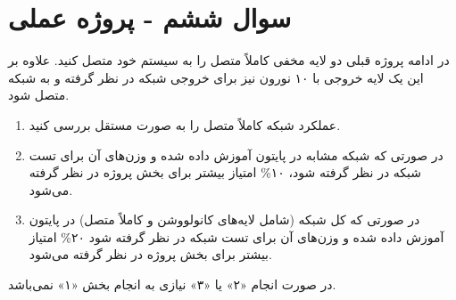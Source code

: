 \section{سوال ششم - پروژه عملی}


در ادامه پروژه قبلی دو لایه مخفی کاملاً متصل را به سیستم خود متصل کنید. علاوه بر این یک لایه خروجی با ۱۰ نورون نیز برای خروجی شبکه در نظر گرفته و به شبکه متصل شود.



\begin{enumerate}
	\item عملکرد شبکه کاملاً متصل را به صورت مستقل بررسی کنید.
	\item در صورتی که شبکه مشابه در پایتون آموزش داده شده و وزن‌های آن برای تست شبکه در نظر گرفته شود، ۱۰\% امتیاز بیشتر برای بخش پروژه در نظر گرفته می‌شود.
	\item در صورتی که کل شبکه (شامل لایه‌های کانولووشن و کاملاً متصل) در پایتون آموزش داده شده و وزن‌های آن برای تست شبکه در نظر گرفته شود ۲۰\% امتیاز بیشتر برای بخش پروژه در نظر گرفته می‌شود.
\end{enumerate}

	
	در صورت انجام «۲» یا «۳» نیازی به انجام بخش «۱» نمی‌باشد.
